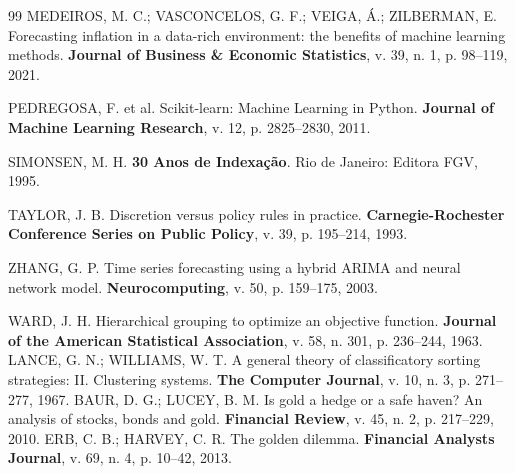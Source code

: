 \documentclass[10pt,twoside]{article}
\begin{document}
\begin{thebibliography}{99}
 MEDEIROS, M. C.; VASCONCELOS, G. F.; VEIGA, Á.; ZILBERMAN, E. Forecasting inflation in a data-rich environment: the benefits of machine learning methods. \textbf{Journal of Business \& Economic Statistics}, v. 39, n. 1, p. 98–119, 2021.

 PEDREGOSA, F. et al. Scikit-learn: Machine Learning in Python. \textbf{Journal of Machine Learning Research}, v. 12, p. 2825–2830, 2011.

 SIMONSEN, M. H. \textbf{30 Anos de Indexação}. Rio de Janeiro: Editora FGV, 1995.

 TAYLOR, J. B. Discretion versus policy rules in practice. \textbf{Carnegie-Rochester Conference Series on Public Policy}, v. 39, p. 195–214, 1993.

 ZHANG, G. P. Time series forecasting using a hybrid ARIMA and neural network model. \textbf{Neurocomputing}, v. 50, p. 159–175, 2003.

 WARD, J. H. Hierarchical grouping to optimize an objective function. \textbf{Journal of the American Statistical Association}, v. 58, n. 301, p. 236--244, 1963.
 LANCE, G. N.; WILLIAMS, W. T. A general theory of classificatory sorting strategies: II. Clustering systems. \textbf{The Computer Journal}, v. 10, n. 3, p. 271--277, 1967.
 BAUR, D. G.; LUCEY, B. M. Is gold a hedge or a safe haven? An analysis of stocks, bonds and gold. \textbf{Financial Review}, v. 45, n. 2, p. 217--229, 2010.
 ERB, C. B.; HARVEY, C. R. The golden dilemma. \textbf{Financial Analysts Journal}, v. 69, n. 4, p. 10--42, 2013.

\end{thebibliography}
\end{document}
